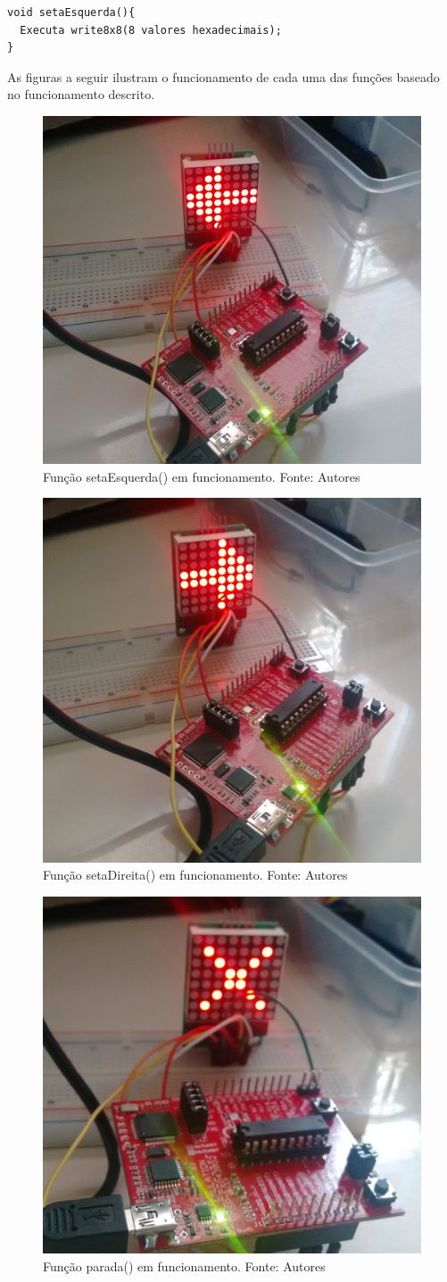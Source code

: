 \documentclass[conference]{IEEEtran}
\begin{document}
\begin{lstlisting}
void setaEsquerda(){
  Executa write8x8(8 valores hexadecimais);
}
\end{lstlisting}

As figuras a seguir ilustram o funcionamento de cada uma das funções baseado no funcionamento descrito.

\begin{figure}[H]
  \centering
  \includegraphics[width=0.5\linewidth]{esq}
  \caption{Função setaEsquerda() em funcionamento. Fonte: Autores}
  \label{fig:esq}
\end{figure}

\begin{figure}[H]
  \centering
  \includegraphics[width=0.5\linewidth]{dir}
  \caption{Função setaDireita() em funcionamento. Fonte: Autores}
  \label{fig:dir}
\end{figure}

\begin{figure}[H]
  \centering
  \includegraphics[width=0.5\linewidth]{parada}
  \caption{Função parada() em funcionamento. Fonte: Autores}
  \label{fig:parada}
\end{figure}
\end{document}
